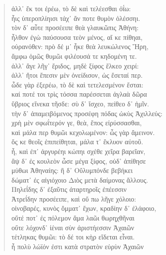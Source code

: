 \begin{Spacing}{1.5}
\begin{verse}
{\large\g ἀλλ᾽ ἔκ τοι ἐρέω, τὸ δὲ καὶ τελέεσθαι ὀΐω:  } \\
{\large\g ἧις ὑπεροπλίηισι τάχ᾽ ἄν ποτε θυμὸν ὀλέσσηι.  } \\
{\large\g τὸν δ᾽ αὖτε προσέειπε θεὰ γλαυκῶπις Ἀθήνη:  } \\
{\large\g ἦλθον ἐγὼ παύσουσα τεὸν μένος, αἴ κε πίθηαι,  } \\
{\large\g οὐρανόθεν: πρὸ δέ μ᾽ ἧκε θεὰ λευκώλενος Ἥρη,  } \\
{\large\g ἄμφω ὁμῶς θυμῶι φιλέουσά τε κηδομένη τε.  } \\
{\large\g ἀλλ᾽ ἄγε λῆγ᾽ ἔριδος, μηδὲ ξίφος ἕλκεο χειρί:  } \\
{\large\g ἀλλ᾽ ἤτοι ἔπεσιν μὲν ὀνείδισον, ὡς ἔσεταί περ.  } \\
{\large\g ὧδε γὰρ ἐξερέω, τὸ δὲ καὶ τετελεσμένον ἔσται:  } \\
{\large\g καί ποτέ τοι τρὶς τόσσα παρέσσεται ἀγλαὰ δῶρα  } \\
{\large\g ὕβριος εἵνεκα τῆσδε: σὺ δ᾽ ἴσχεο, πείθεο δ᾽ ἡμῖν.  } \\
{\large\g τὴν δ᾽ ἀπαμειβόμενος προσέφη πόδας ὠκὺς Ἀχιλλεύς:  } \\
{\large\g χρὴ μὲν σφωΐτερόν γε, θεὰ, ἔπος εἰρύσσασθαι,  } \\
{\large\g καὶ μάλα περ θυμῶι κεχολωμένον: ὧς γὰρ ἄμεινον.  } \\
{\large\g ὅς κε θεοῖς ἐπιπείθηται, μάλα τ᾽ ἔκλυον αὐτοῦ.  } \\
{\large\g ἦ, καὶ ἐπ᾽ ἀργυρέηι κώπηι σχέθε χεῖρα βαρεῖαν,  } \\
{\large\g ἂψ δ᾽ ἐς κουλεὸν ὦσε μέγα ξίφος, οὐδ᾽ ἀπίθησε  } \\
{\large\g μύθωι Ἀθηναίης: ἣ δ᾽ Οὔλυμπόνδε βεβήκει  } \\
{\large\g δώματ᾽ ἐς αἰγιόχοιο Διὸς μετὰ δαίμονας ἄλλους.  } \\
{\large\g Πηλεΐδης δ᾽ ἐξαῦτις ἀταρτηροῖς ἐπέεσσιν  } \\
{\large\g Ἀτρεΐδην προσέειπε, καὶ οὔ πω λῆγε χόλοιο:  } \\
{\large\g οἰνοβαρές, κυνὸς ὄμματ᾽ ἔχων, κραδίην δ᾽ ἐλάφοιο,  } \\
{\large\g οὔτέ ποτ᾽ ἐς πόλεμον ἅμα λαῶι θωρηχθῆναι  } \\
{\large\g οὔτε λόχονδ᾽ ἰέναι σὺν ἀριστήεσσιν Ἀχαιῶν  } \\
{\large\g τέτληκας θυμῶι: τὸ δέ τοι κὴρ εἴδεται εἶναι.  } \\
{\large\g ἦ πολὺ λώϊόν ἐστι κατὰ στρατὸν εὐρὺν Ἀχαιῶν  } \\

\end{verse}
\end{Spacing}
